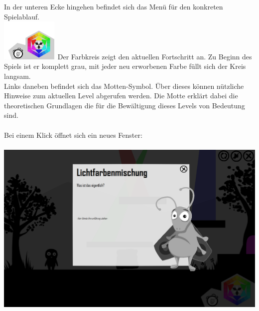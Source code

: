 \documentclass[10pt,a4paper,notitlepage]{report}
\begin{document}
	In der unteren Ecke hingehen befindet sich das Menü für den konkreten Spielablauf.
\\
	\includegraphics[width=0.2\textwidth]{png/menu.png}\ 
	Der Farbkreis zeigt den aktuellen Fortschritt an. Zu Beginn des Spiels ist er komplett grau, mit jeder neu erworbenen Farbe füllt sich der Kreis langsam.\\
	Links daneben befindet sich das Motten-Symbol. Über dieses können nützliche Hinweise zum aktuellen Level abgerufen werden. Die Motte erklärt dabei die 		theoretischen Grundlagen die für die Bewältigung dieses Levels von Bedeutung sind.\\\\
	Bei einem Klick öffnet sich ein neues Fenster:\\\\
	\includegraphics[width=1\textwidth]{png/screen_help.png}\ 
\\\\
	\Fusszeile
\end{document}
